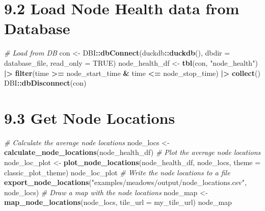 \documentclass[
]{book}
\newenvironment{Shaded}{\begin{snugshade}}{\end{snugshade}}
\newcommand{\AttributeTok}[1]{\textcolor[rgb]{0.13,0.29,0.53}{#1}}
\newcommand{\CommentTok}[1]{\textcolor[rgb]{0.56,0.35,0.01}{\textit{#1}}}
\newcommand{\ConstantTok}[1]{\textcolor[rgb]{0.56,0.35,0.01}{#1}}
\newcommand{\FunctionTok}[1]{\textcolor[rgb]{0.13,0.29,0.53}{\textbf{#1}}}
\newcommand{\NormalTok}[1]{#1}
\newcommand{\OtherTok}[1]{\textcolor[rgb]{0.56,0.35,0.01}{#1}}
\newcommand{\SpecialCharTok}[1]{\textcolor[rgb]{0.81,0.36,0.00}{\textbf{#1}}}
\newcommand{\StringTok}[1]{\textcolor[rgb]{0.31,0.60,0.02}{#1}}
\begin{document}
\section{9.2 Load Node Health data from Database}\label{load-node-health-data-from-database}

\begin{Shaded}
\begin{Highlighting}[]
\CommentTok{\# Load from DB}
\NormalTok{con }\OtherTok{\textless{}{-}}\NormalTok{ DBI}\SpecialCharTok{::}\FunctionTok{dbConnect}\NormalTok{(duckdb}\SpecialCharTok{::}\FunctionTok{duckdb}\NormalTok{(), }\AttributeTok{dbdir =}\NormalTok{ database\_file, }\AttributeTok{read\_only =} \ConstantTok{TRUE}\NormalTok{)}
\NormalTok{node\_health\_df }\OtherTok{\textless{}{-}} \FunctionTok{tbl}\NormalTok{(con, }\StringTok{"node\_health"}\NormalTok{) }\SpecialCharTok{|\textgreater{}}
  \FunctionTok{filter}\NormalTok{(time }\SpecialCharTok{\textgreater{}=}\NormalTok{ node\_start\_time }\SpecialCharTok{\&}\NormalTok{ time }\SpecialCharTok{\textless{}=}\NormalTok{ node\_stop\_time) }\SpecialCharTok{|\textgreater{}}
  \FunctionTok{collect}\NormalTok{()}
\NormalTok{DBI}\SpecialCharTok{::}\FunctionTok{dbDisconnect}\NormalTok{(con)}
\end{Highlighting}
\end{Shaded}

\section{9.3 Get Node Locations}\label{get-node-locations-2}

\begin{Shaded}
\begin{Highlighting}[]
\CommentTok{\# Calculate the average node locations}
\NormalTok{node\_locs }\OtherTok{\textless{}{-}} \FunctionTok{calculate\_node\_locations}\NormalTok{(node\_health\_df)}
\CommentTok{\# Plot the average node locations}
\NormalTok{node\_loc\_plot }\OtherTok{\textless{}{-}} \FunctionTok{plot\_node\_locations}\NormalTok{(node\_health\_df,}
\NormalTok{                                     node\_locs,}
                                     \AttributeTok{theme =}\NormalTok{ classic\_plot\_theme)}
\NormalTok{node\_loc\_plot}
\CommentTok{\# Write the node locations to a file}
\FunctionTok{export\_node\_locations}\NormalTok{(}\StringTok{"examples/meadows/output/node\_locations.csv"}\NormalTok{, node\_locs)}
\CommentTok{\# Draw a map with the node locations}
\NormalTok{node\_map }\OtherTok{\textless{}{-}} \FunctionTok{map\_node\_locations}\NormalTok{(node\_locs, }\AttributeTok{tile\_url =}\NormalTok{ my\_tile\_url)}
\NormalTok{node\_map}
\end{Highlighting}
\end{Shaded}
\end{document}
